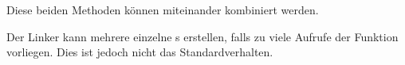 Diese beiden Methoden können miteinander kombiniert werden.

Der Linker kann mehrere einzelne s erstellen, falls zu viele Aufrufe der
Funktion vorliegen. Dies ist jedoch nicht das Standardverhalten.

%
%
%
%
%
%
%
%
